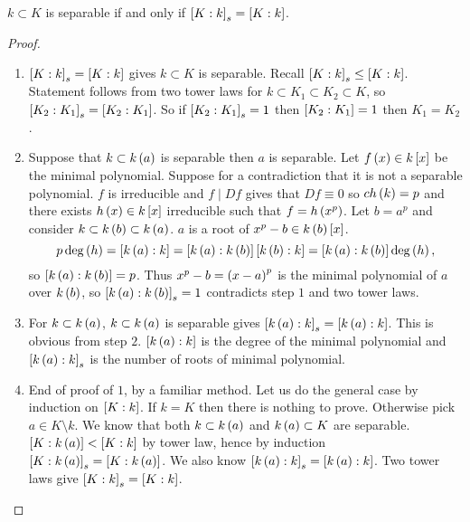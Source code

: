 \begin{theorem}
$ k \subset K $ is separable if and only if $ \sb{K : k}_s = \sb{K : k} $.
\end{theorem}

\begin{proof}
\hfill
\begin{enumerate}[leftmargin=0.5in, label=Step \arabic*.]
\item $ \sb{K : k}_s = \sb{K : k} $ gives $ k \subset K $ is separable. Recall $ \sb{K : k}_s \le \sb{K : k} $. Statement follows from two tower laws for $ k \subset K_1 \subset K_2 \subset K $, so $ \sb{K_2 : K_1}_s = \sb{K_2 : K_1} $. So if $ \sb{K_2 : K_1}_s = 1 $ then $ \sb{K_2 : K_1} = 1 $ then $ K_1 = K_2 $.
\item Suppose that $ k \subset k\rb{a} $ is separable then $ a $ is separable. Let $ f\rb{x} \in k\sb{x} $ be the minimal polynomial. Suppose for a contradiction that it is not a separable polynomial. $ f $ is irreducible and $ f \mid Df $ gives that $ Df \equiv 0 $ so $ ch\rb{k} = p $ and there exists $ h\rb{x} \in k\sb{x} $ irreducible such that $ f = h\rb{x^p} $. Let $ b = a^p $ and consider $ k \subset k\rb{b} \subset k\rb{a} $. $ a $ is a root of $ x^p - b \in k\rb{b}\sb{x} $.
$$ p\deg\rb{h} = \sb{k\rb{a} : k} = \sb{k\rb{a} : k\rb{b}}\sb{k\rb{b} : k} = \sb{k\rb{a} : k\rb{b}}\deg\rb{h}, $$
so $ \sb{k\rb{a} : k\rb{b}} = p $. Thus $ x^p - b = \rb{x - a}^p $ is the minimal polynomial of $ a $ over $ k\rb{b} $, so $ \sb{k\rb{a} : k\rb{b}}_s = 1 $ contradicts step $ 1 $ and two tower laws.
\item For $ k \subset k\rb{a} $, $ k \subset k\rb{a} $ is separable gives $ \sb{k\rb{a} : k}_s = \sb{k\rb{a} : k} $. This is obvious from step $ 2 $. $ \sb{k\rb{a} : k} $ is the degree of the minimal polynomial and $ \sb{k\rb{a} : k}_s $ is the number of roots of minimal polynomial.
\item End of proof of $ 1 $, by a familiar method. Let us do the general case by induction on $ \sb{K : k} $. If $ k = K $ then there is nothing to prove. Otherwise pick $ a \in K \setminus k $. We know that both $ k \subset k\rb{a} $ and $ k\rb{a} \subset K $ are separable. $ \sb{K : k\rb{a}} < \sb{K : k} $ by tower law, hence by induction $ \sb{K : k\rb{a}}_s = \sb{K : k\rb{a}} $. We also know $ \sb{k\rb{a} : k}_s = \sb{k\rb{a} : k} $. Two tower laws give $ \sb{K : k}_s = \sb{K : k} $.
\end{enumerate}
\end{proof}


